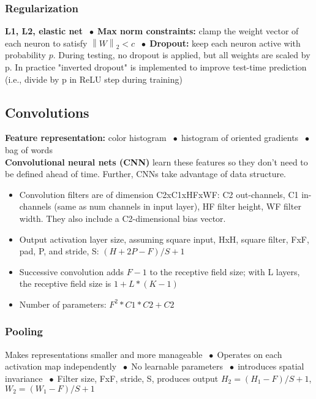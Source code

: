\documentclass[9pt]{extarticle}
\newcommand{\norm}[2]{\left\lVert#1\right\rVert_#2}
\newcommand*\bspace{$\; \bullet \;$}
\begin{document}
\subsubsection{Regularization}
\textbf{L1, L2, elastic net} \bspace \textbf{Max norm constraints:} clamp the weight vector of each neuron to satisfy $\norm{W}{2} < c$ \bspace \textbf{Dropout:} keep each neuron active with probability $p$. During testing, no dropout is applied, but all weights are scaled by p. In practice "inverted dropout" is implemented to improve test-time prediction (i.e., divide by p in ReLU step during training)

\subsection{Convolutions}
\textbf{Feature representation:} color histogram \bspace histogram of oriented gradients \bspace bag of words\\
\textbf{Convolutional neural nets (CNN)} learn these features so they don't need to be defined ahead of time. Further, CNNs take advantage of data structure.
\begin{itemize}
    \item Convolution filters are of dimension C2xC1xHFxWF: C2 out-channels, C1 in-channels (same as num channels in input layer), HF filter height, WF filter width. They also include a C2-dimensional bias vector.
    \item Output activation layer size, assuming square input, HxH, square filter, FxF, pad, P, and stride, S: $(H + 2P - F) / S + 1$
    \item Successive convolution adds $F-1$ to the receptive field size; with L layers, the receptive field size is $1 + L*(K-1)$
    \item Number of parameters: $F^2*C1*C2 + C2$
\end{itemize}

\subsubsection{Pooling}
Makes representations smaller and more manageable \bspace Operates on each activation map independently \bspace No learnable parameters \bspace introduces spatial invariance \bspace Filter size, FxF, stride, S, produces output $H_2 = (H_1 - F)/S + 1$, $W_2 = (W_1 - F)/S + 1$
\end{document}
